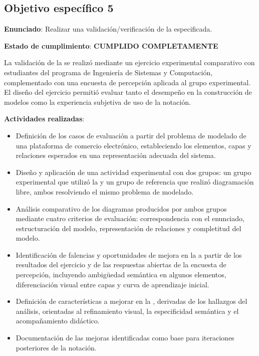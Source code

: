 \subsection{Objetivo específico 5}
\noindent

\textbf{Enunciado}: Realizar una validación/verificación de la \NDITI especificada.

\textbf{Estado de cumplimiento}: \textbf{CUMPLIDO COMPLETAMENTE}

La validación de la \NDITI se realizó mediante un ejercicio experimental comparativo con estudiantes del programa de Ingeniería de Sistemas y Computación, complementado con una encuesta de percepción aplicada al grupo experimental. El diseño del ejercicio permitió evaluar tanto el desempeño en la construcción de modelos como la experiencia subjetiva de uso de la notación.

\textbf{Actividades realizadas}:
\begin{itemize}
    \item Definición de los casos de evaluación a partir del problema de modelado de una plataforma de comercio electrónico, estableciendo los elementos, capas y relaciones esperados en una representación adecuada del sistema.
    \item Diseño y aplicación de una actividad experimental con dos grupos: un grupo experimental que utilizó la \NDITI y un grupo de referencia que realizó diagramación libre, ambos resolviendo el mismo problema de modelado.
    \item Análisis comparativo de los diagramas producidos por ambos grupos mediante cuatro criterios de evaluación: correspondencia con el enunciado, estructuración del modelo, representación de relaciones y completitud del modelo.
    \item Identificación de falencias y oportunidades de mejora en la \NDITI a partir de los resultados del ejercicio y de las respuestas abiertas de la encuesta de percepción, incluyendo ambigüedad semántica en algunos elementos, diferenciación visual entre capas y curva de aprendizaje inicial.
    \item Definición de características a mejorar en la \NDITI, derivadas de los hallazgos del análisis, orientadas al refinamiento visual, la especificidad semántica y el acompañamiento didáctico.
    \item Documentación de las mejoras identificadas como base para iteraciones posteriores de la notación.
\end{itemize}

